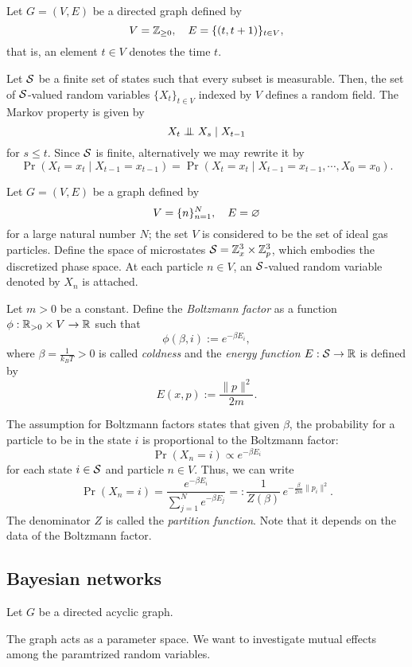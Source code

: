 \documentclass{../exp}
\begin{document}
\begin{ex}
Let $G=(V,E)$ be a directed graph defined by
\[V=\mathbb{Z}_{\ge0},\quad E=\{(t,t+1)\}_{t\in V},\]
that is, an element $t\in V$ denotes the time $t$.

Let $\mathcal{S}$ be a finite set of states such that every subset is measurable.
Then, the set of $\mathcal{S}$-valued random variables $\{X_t\}_{t\in V}$ indexed by $V$ defines a random field.
The Markov property is given by
\[X_t\mathrel{\perp\mspace{-10mu}\perp} X_s\mid X_{t-1}\]
for $s\le t$.
Since $\mathcal{S}$ is finite, alternatively we may rewrite it by
\[\Pr(X_t=x_t\mid X_{t-1}=x_{t-1})=\Pr(X_t=x_t\mid X_{t-1}=x_{t-1},\cdots,X_0=x_0).\]
\end{ex}

\begin{ex}
Let $G=(V,E)$ be a graph defined by
\[V=\{n\}_{n=1}^N,\quad E=\varnothing\]
for a large natural number $N$; the set $V$ is considered to be the set of ideal gas particles.
Define the space of microstates $\mathcal{S}=\mathbb{Z}_x^3\times\mathbb{Z}_p^3$, which embodies the discretized phase space.
At each particle $n\in V$, an $\mathcal{S}$-valued random variable denoted by $X_n$ is attached.

Let $m>0$ be a constant.
Define the \emph{Boltzmann factor} as a function $\phi:\R_{>0}\x V\to\R$ such that
\[\phi(\beta,i):=e^{-\beta E_i},\]
where $\beta=\frac1{k_BT}>0$ is called \emph{coldness} and the \emph{energy function} $E:\cS\to\R$ is defined by
\[E(x,p):=\frac{\|p\|^2}{2m}.\]

The assumption for Boltzmann factors states that given $\beta$, the probability for a particle to be in the state $i$ is proportional to the Boltzmann factor: 
\[\Pr(X_n=i)\propto e^{-\beta E_i}\]
for each state $i\in\mathcal{S}$ and particle $n\in V$.
Thus, we can write
\[\Pr(X_n=i)=\frac{e^{-\beta E_i}}{\sum_{j=1}^Ne^{-\beta E_j}}=:\frac1{Z(\beta)}\,e^{-\frac\beta{2m}\|p_i\|^2}.\]
The denominator $Z$ is called the \emph{partition function}.
Note that it depends on the data of the Boltzmann factor.
\end{ex}


\subsection{Bayesian networks}


\begin{defn}
Let $G$ be a directed acyclic graph.
\end{defn}
The graph acts as a parameter space.
We want to investigate mutual effects among the paramtrized random variables.
\begin{thm}

\end{thm}
\end{document}
